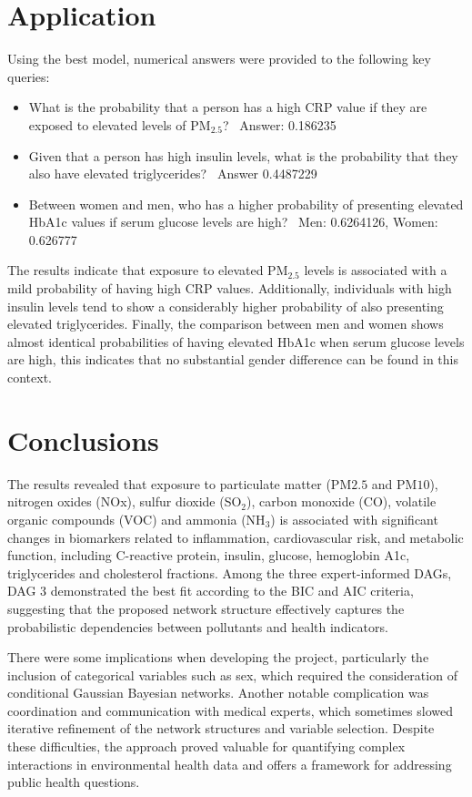 \documentclass[twocolumn]{article}
\begin{document}
\section{Application}
Using the best model, numerical answers were provided to the following key queries: 
\begin{itemize}
    \item What is the probability that a person has a high CRP value if they are exposed to elevated levels of PM$_{2.5}$? \hfill $ \, $
    Answer: 0.186235
    \item Given that a person has high insulin levels, what is the probability that they also have elevated triglycerides? \hfill $ \, $
    Answer 0.4487229
    \item Between women and men, who has a higher probability of presenting elevated HbA1c values if serum glucose levels are high? \hfill $ \, $
    Men: 0.6264126, Women: 0.626777
    
\end{itemize}
The results indicate that exposure to elevated PM$_{2.5}$ levels is associated with a mild probability of having high CRP values. Additionally, individuals with high insulin levels tend to show a considerably higher probability of also presenting elevated triglycerides. Finally, the comparison between men and women shows almost identical probabilities of having elevated HbA1c when serum glucose levels are high, this indicates that no substantial gender difference can be found in this context.


\section{Conclusions}
The results revealed that exposure to particulate matter (PM${2.5}$ and PM${10}$), nitrogen oxides (NOx), sulfur dioxide (SO$_2$), carbon monoxide (CO), volatile organic compounds (VOC) and ammonia (NH$_3$) is associated with significant changes in biomarkers related to inflammation, cardiovascular risk, and metabolic function, including C-reactive protein, insulin, glucose, hemoglobin A1c, triglycerides and cholesterol fractions. Among the three expert-informed DAGs, DAG 3 demonstrated the best fit according to the BIC and AIC criteria, suggesting that the proposed network structure effectively captures the probabilistic dependencies between pollutants and health indicators.

There were some implications when developing the project, particularly the inclusion of categorical variables such as sex, which required the consideration of conditional Gaussian Bayesian networks. Another notable complication was coordination and communication with medical experts, which sometimes slowed iterative refinement of the network structures and variable selection. Despite these difficulties, the approach proved valuable for quantifying complex interactions in environmental health data and offers a framework for addressing public health questions. 
\end{document}

